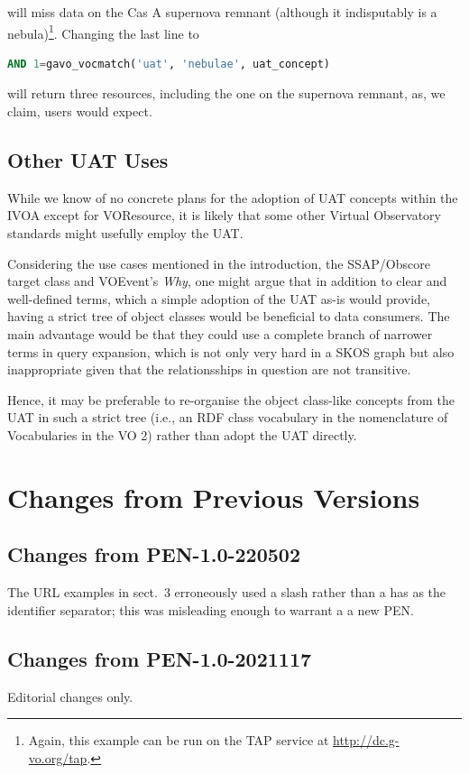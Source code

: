 \documentclass[11pt,a4paper]{ivoa}
\begin{document}
\noindent will miss data on the Cas A supernova remnant (although it indisputably
is a nebula)\footnote{Again, this example can be run on the TAP service
at \url{http://dc.g-vo.org/tap}.}.  Changing the last line to

\begin{lstlisting}[language=SQL]
    AND 1=gavo_vocmatch('uat', 'nebulae', uat_concept)
\end{lstlisting}

\noindent will return three resources, including 
the one on the supernova remnant,
as, we claim, users would expect.

\subsection{Other UAT Uses}

While we know of no concrete plans for the adoption of UAT concepts
within the IVOA except for
VOResource, it is likely that some other Virtual Observatory
standards might usefully employ the UAT.  

Considering the use cases mentioned in the introduction, the
SSAP/Obscore target class and VOEvent's \emph{Why}, one might argue that
in addition to clear and well-defined terms, which a simple adoption
of the UAT as-is would provide, having a strict tree of object
classes would be beneficial to data consumers.  The main advantage would
be that they could use a complete branch of narrower terms in query
expansion, which is not only very hard in a SKOS graph but also
inappropriate given that the relationsships in question are not
transitive.

Hence, it may be preferable to re-organise the object class-like
concepts from the UAT in such a strict tree (i.e., an RDF class
vocabulary in the nomenclature of Vocabularies in the VO 2) rather than
adopt the UAT directly.

\appendix
\section{Changes from Previous Versions}

\subsection{Changes from PEN-1.0-220502}

The URL examples in sect.~3 erroneously used a slash rather than a
has as the identifier separator; this was misleading enough to warrant a
a new PEN.

\subsection{Changes from PEN-1.0-2021117}

Editorial changes only.


\end{document}
